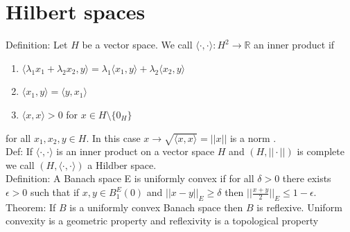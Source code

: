 \documentclass[11pt]{article}
\begin{document}
\section{Hilbert spaces}
Definition: Let $H$ be a vector space. We call $\langle \cdot, \cdot \rangle : H^2 \rightarrow \mathbb{R}$ an inner product
if
\begin{enumerate}
    \item $\langle \lambda_1x_1 + \lambda_2 x_2, y \rangle = \lambda_1 \langle x_1,y \rangle + \lambda_2 \langle x_2, y \rangle$
    \item $\langle x_1,y \rangle = \langle y,x_1 \rangle$ 
    \item $\langle x, x \rangle >0$ for $x \in H \setminus \{0_H\}$
\end{enumerate}
for all $x_1,x_2,y \in H$.
In this case $x \to \sqrt{ \langle x, x \rangle} = ||x||$ is a norm .\\
Def: If $\langle \cdot, \cdot \rangle$ is an inner product on a vector space $H$ and $(H, ||\cdot||)$ is complete
we call  $(H, \langle \cdot, \cdot \rangle)$ a Hildber space.\\
Definition: A Banach space E is uniformly convex if for all $\delta > 0$ there exists $\epsilon > 0$ such that
if $x,y \in B_1^{E}(0)$ and $||x-y||_E \ge \delta$ then $|| \frac{x+y}{2}||_E  \le 1- \epsilon$.\\
Theorem: If $B$ is a uniformly convex Banach space then $B$ is reflexive.
Uniform convexity is a geometric property and reflexivity is a topological property
\end{document}
